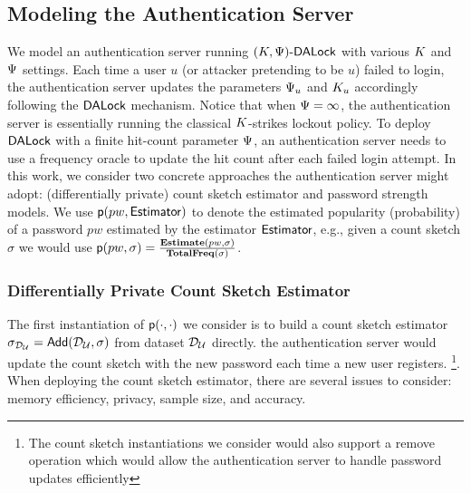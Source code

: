 




\subsection{Modeling the Authentication Server}\label{section:ExperimentDesign-subsection:SimulateServer} %


We model an authentication server running $(K, \Psi)\text{-}\mathsf{DALock}$ with various $K$ and $\Psi$ settings. Each time a user $u$ (or attacker pretending to be $u$) failed to login, the authentication server updates the parameters $\Psi_{u}$ and $K_{u}$ accordingly following the $\mathsf{DALock}$ mechanism. Notice that when $ \Psi = \infty$, the authentication server is essentially running the classical $K$-strikes lockout policy. To deploy $\mathsf{DALock}$ with a finite hit-count parameter $ \Psi$, an authentication server needs to use a frequency oracle to update the hit count after each failed login attempt.  In this work, we consider two concrete approaches the authentication server might adopt: (differentially private) count sketch estimator and password strength models. We use $\textsf{p}(pw,\mathsf{Estimator})$ to denote the estimated popularity (probability) of a password $pw$ estimated by the estimator $\mathsf{Estimator}$, e.g., given a count sketch $\sigma$ we would use  $\textsf{p}(pw,\sigma) = \frac{\mathbf{Estimate}(pw,\sigma)}{\mathbf{TotalFreq(\sigma)}}$. 






\subsubsection{Differentially Private Count Sketch Estimator} 


The first instantiation of $\textsf{p}(\cdot,\cdot) $ we consider is to build a count sketch estimator $\sigma_{\mathcal{D}_{{\mathcal{U}}}} = \mathsf{Add}(\mathcal{D}_{{\mathcal{U}}},\sigma) $ from dataset $\mathcal{D}_{{\mathcal{U}}} $ directly. the authentication server would update the count sketch with the new password each time a new user registers. \footnote{The count sketch instantiations we consider would also support a remove operation which would allow the authentication server to handle password updates efficiently}. When deploying the count sketch estimator, there are several issues to consider: memory efficiency, privacy, sample size, and accuracy. 



